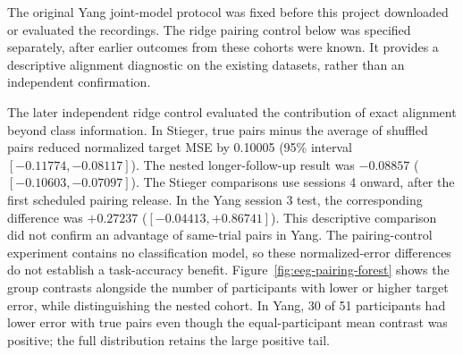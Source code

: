 \documentclass[11pt,a4paper]{article}
\begin{document}
The original Yang joint-model protocol was fixed before this project downloaded or evaluated the recordings. The ridge pairing control below was specified separately, after earlier outcomes from these cohorts were known. It provides a descriptive alignment diagnostic on the existing datasets, rather than an independent confirmation.

The later independent ridge control evaluated the contribution of exact alignment beyond class information. In Stieger, true pairs minus the average of shuffled pairs reduced normalized target MSE by 0.10005 (95\% interval $[-0.11774,-0.08117]$). The nested longer-follow-up result was $-0.08857$ ($[-0.10603,-0.07097]$). The Stieger comparisons use sessions 4 onward, after the first scheduled pairing release. In the Yang session 3 test, the corresponding difference was $+0.27237$ ($[-0.04413,+0.86741]$). This descriptive comparison did not confirm an advantage of same-trial pairs in Yang. The pairing-control experiment contains no classification model, so these normalized-error differences do not establish a task-accuracy benefit. Figure~\ref{fig:eeg-pairing-forest} shows the group contrasts alongside the number of participants with lower or higher target error, while distinguishing the nested cohort. In Yang, 30 of 51 participants had lower error with true pairs even though the equal-participant mean contrast was positive; the full distribution retains the large positive tail.
\end{document}
